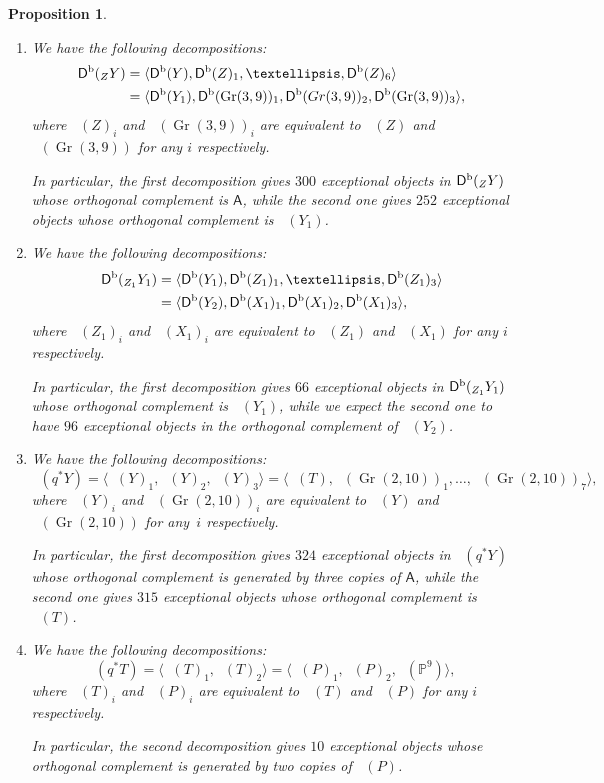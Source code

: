 \documentclass[11pt]{article}
\newcommand{\skpt}{\smallskip}
\newcommand{\NoChangel}[1]{%
\expandafter\let\csname old\string#1\endcsname=#1
\let#1=\relax
\newcommand{#1}{\mathcode`l="716C\csname old\string#1\endcsname\mathcode`l="7160 }%
}
\newcommand{\Bl}{\mathrm{Bl}}\NoChangel{\Bl}
\theoremstyle{plain}
\newtheorem{prop}[theorem]{Proposition}
\theoremstyle{definition}
\newcommand{\cat}[1]{\mathsf{#1}}
\newcommand{\sod}[1]{\langle #1 \rangle}
\DeclareMathOperator{\Db}{{\cat{D}^{\mathrm{b}}}}
\DeclareMathOperator{\Gr}{Gr}
\newcommand{\PP}{\mathbb{P}}
\renewcommand{\theenumi}{\alph{enumi}}
\begin{document}
\skpt
\begin{prop}\label{prop:decos-in-the-diagram}
\begin{enumerate}\renewcommand{\theenumi}{\Alph{enumi}}
\item\label{enum:A}
We have the following decompositions:
\begin{align*}
\Db(\Bl_Z Y) &= \sod{\Db(Y), \Db(Z)_1,\ldots,\Db(Z)_6}\\
&= \sod{\Db(Y_1),\Db(\Gr(3,9))_1,\Db(Gr(3,9))_2,\Db(\Gr(3,9))_3},
\end{align*}
where $\Db(Z)_i$ and $\Db(\Gr(3,9))_i$ are equivalent to $\Db(Z)$ and
$\Db(\Gr(3,9))$ for any $i$ respectively.

In particular, the first decomposition gives $300$ exceptional objects in $\Db(\Bl_Z Y)$
whose orthogonal complement is $\cat{A}$, while the second one gives $252$ exceptional objects
whose orthogonal complement is $\Db(Y_1)$.

\item\label{enum:B}
We have the following decompositions:
\begin{align*}
\Db(\Bl_{Z_1} Y_1) &= \sod{\Db(Y_1), \Db(Z_1)_1,\ldots,\Db(Z_1)_3}\\
&= \sod{\Db(Y_2),\Db(X_1)_1,\Db(X_1)_2,\Db(X_1)_3},
\end{align*}
where $\Db(Z_1)_i$ and $\Db(X_1)_i$ are equivalent to $\Db(Z_1)$ and
$\Db(X_1)$ for any $i$ respectively.

In particular, the first decomposition gives $66$
exceptional objects in $\Db(\Bl_{Z_1} Y_1)$
whose orthogonal complement is $\Db(Y_1)$, while we expect the second one
to have $96$ exceptional objects in the orthogonal complement of $\Db(Y_2)$.

\item\label{enum:C}
We have the following decompositions:
\[
\Db(q^* Y) = \sod{\Db(Y)_1, \Db(Y)_2,\Db(Y)_3}= \sod{\Db(T),\Db(\Gr(2,10))_1,\ldots,\Db(\Gr(2,10))_7},
\]
where $\Db(Y)_i$ and $\Db(\Gr(2,10))_i$ are equivalent to $\Db(Y)$ and
$\Db(\Gr(2,10))$ for any~$i$ respectively.

In particular, the first decomposition gives $324$ exceptional objects in $\Db(q^* Y)$
whose orthogonal complement is generated by three copies of $\cat{A}$, while the second one gives
$315$ exceptional objects whose orthogonal complement is $\Db(T)$.

\item\label{enum:D}
We have the following decompositions:
\[
\Db(q^* T) = \sod{\Db(T)_1, \Db(T)_2}= \sod{\Db(P)_1,\Db(P)_2,\Db(\PP^9)},
\]
where $\Db(T)_i$ and $\Db(P)_i$ are equivalent to $\Db(T)$ and
$\Db(P)$ for any $i$ respectively.

In particular, the second decomposition gives $10$ exceptional objects
whose orthogonal complement is generated by two copies of $\Db(P)$.
\end{enumerate}
\end{prop}
\end{document}
